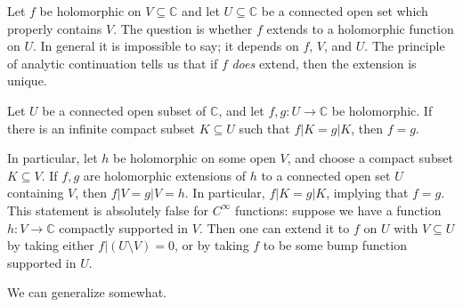 
Let $f$ be holomorphic on $V\subseteq \mathbb{C} $ and let $U\subseteq \mathbb{C} $ be a connected open set which properly contains $V$. The question is whether $f$ extends to a holomorphic function on $U$. In general it is impossible to say; it depends on $f$, $V$, and $U$. The principle of analytic continuation tells us that if $f$ \emph{does} extend, then the extension is unique.

\begin{proposition}\label{prp:salkds}
	Let $U$ be a connected open subset of $\mathbb{C} $, and let $f,g : U \to \mathbb{C} $ be holomorphic. If there is an infinite compact subset $K\subseteq U$ such that $f|K=g|K$, then $f=g$.
\end{proposition}

In particular, let $h$ be holomorphic on some open $V$, and choose a compact subset $K\subseteq V$. If $f,g$ are holomorphic extensions of $h$ to a connected open set $U$ containing $V$, then $f|V=g|V=h$. In particular, $f|K=g|K$, implying that $f=g$. This statement is absolutely false for $C^\infty $ functions: suppose we have a function $h : V \to \mathbb{C} $ compactly supported in $V$. Then one can extend it to $f$ on $U$ with $V\subseteq U$ by taking either $f|(U\setminus V)=0$, or by taking $f$ to be some bump function supported in $U$.

We can generalize somewhat.

